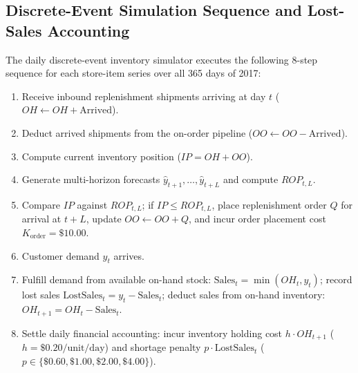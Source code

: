 \documentclass[11pt,a4paper]{article}
\begin{document}
\subsection{Discrete-Event Simulation Sequence and Lost-Sales Accounting}
\label{sec:meth_sim_seq}
The daily discrete-event inventory simulator executes the following 8-step sequence for each store-item series over all 365 days of 2017:
\begin{enumerate}
    \item Receive inbound replenishment shipments arriving at day $t$ ($OH \leftarrow OH + \text{Arrived}$).
    \item Deduct arrived shipments from the on-order pipeline ($OO \leftarrow OO - \text{Arrived}$).
    \item Compute current inventory position ($IP = OH + OO$).
    \item Generate multi-horizon forecasts $\hat{y}_{t+1},\dots,\hat{y}_{t+L}$ and compute $ROP_{t,L}$.
    \item Compare $IP$ against $ROP_{t,L}$; if $IP \le ROP_{t,L}$, place replenishment order $Q$ for arrival at $t+L$, update $OO \leftarrow OO + Q$, and incur order placement cost $K_{\text{order}} = \$10.00$.
    \item Customer demand $y_t$ arrives.
    \item Fulfill demand from available on-hand stock: $\text{Sales}_t = \min(OH_t, y_t)$; record lost sales $\text{LostSales}_t = y_t - \text{Sales}_t$; deduct sales from on-hand inventory: $OH_{t+1} = OH_t - \text{Sales}_t$.
    \item Settle daily financial accounting: incur inventory holding cost $h \cdot OH_{t+1}$ ($h = \$0.20/\text{unit/day}$) and shortage penalty $p \cdot \text{LostSales}_t$ ($p \in \{\$0.60, \$1.00, \$2.00, \$4.00\}$).
\end{enumerate}
\end{document}
